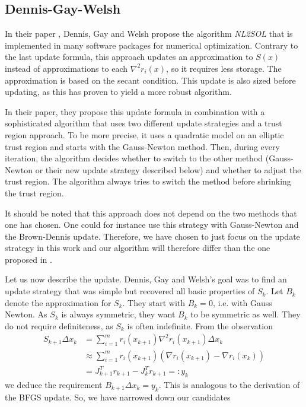 \documentclass{article}
\theoremstyle{plain}%
\theoremstyle{definition}
\begin{document}
\subsection{Dennis-Gay-Welsh}
In their paper \cite{Dennis1981}, Dennis, Gay and Welsh propose the algorithm \emph{NL2SOL}
that is implemented in many software packages for numerical optimization.  Contrary
to the last update formula, this approach updates an approximation to $S(x)$ instead of approximations to each $\nabla^2 r_i(x)$, so it requires less storage. The approximation is based on
the secant condition. This update is also sized before updating, as this has proven to
yield a more robust algorithm. \par
In their paper, they propose this update formula in combination with a sophisticated algorithm that uses two different update
strategies and a trust region approach. To be more precise, it  uses a quadratic model
on an elliptic trust region and starts with the Gauss-Newton method. Then, during
every iteration, the algorithm decides whether to switch to the other method (Gauss-Newton or
their new update strategy described below) and whether to adjust the trust region. The algorithm
always tries to switch the method before shrinking the trust region. \par
It should be noted that this approach does not depend on the two methods that one has chosen.
One could for instance use this strategy with Gauss-Newton and the Brown-Dennis update.
Therefore, we have chosen to just focus on the update strategy in this work and our algorithm
will therefore differ than the one proposed in \cite{Dennis1981}. \par
Let us now describe the update. Dennis, Gay and Welsh's goal was to find an update strategy that
was simple but recovered all basic properties of $S_k$. Let $B_k$ denote the approximation
for $S_k$. They start with $B_k=0$, i.e. with Gauss Newton. As $S_k$ is always symmetric, they
want $B_k$ to be symmetric as well. They do not require definiteness, as $S_k$ is often indefinite.
 From the observation 
 \begin{align*}
   S_{k+1}\Delta x_k&=\sum_{i=1}^m r_i(x_{k+1}) \nabla^2 r_i(x_{k+1}) \Delta x_k\\
& \approx \sum_{i=1}^m r_i(x_{k+1})\left(\nabla r_i (x_{k+1})-\nabla r_i (x_k) \right)\\
&= J^T_{k+1}r_{k+1}-J_k^Tr_{k+1}=:y_k
 \end{align*}
we deduce the requirement $B_{k+1}\Delta x_k = y_k$. This is analogous to the derivation of the BFGS update. So, we have narrowed down our candidates
\end{document}
